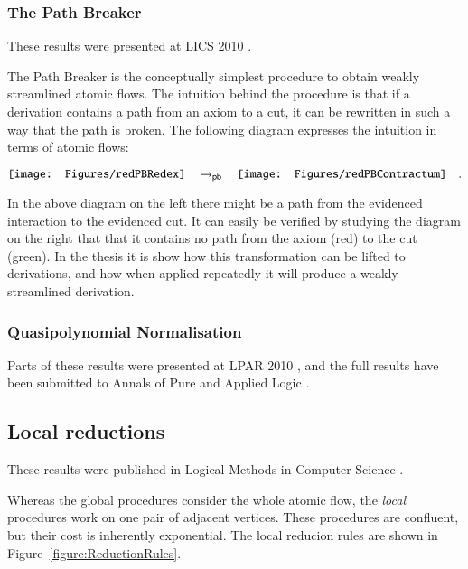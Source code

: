\subsubsection{The Path Breaker}

These results were presented at LICS 2010 \cite{GuglGundStra::Breaking:uq}.

The Path Breaker is the conceptually simplest procedure to obtain weakly streamlined atomic flows. The intuition behind the procedure is that if a derivation contains a path from an axiom to a cut, it can be rewritten in such a way that the path is broken. The following diagram expresses the intuition in terms of atomic flows:

\newcommand{\frpb}{{\mathsf{pb}}}
\[
\vcenter{\hbox{\texttt{[image: Figures/redPBRedex]}}}
\quad\to_\frpb\quad
\vcenter{\hbox{\texttt{[image: Figures/redPBContractum]}}}
\quad.
\]

In the above diagram on the left there might be a path from the evidenced interaction to the evidenced cut. It can easily be verified by studying the diagram on the right that that it contains no path from the axiom (red) to the cut (green). In the thesis it is show how this transformation can be lifted to derivations, and how when applied repeatedly it will produce a weakly streamlined derivation.

\subsubsection{Quasipolynomial Normalisation}

Parts of these results were presented at LPAR 2010 \cite{BrusGuglGundPari:09:A-Quasip:fk}, and the full results have been submitted to 
Annals of Pure and Applied Logic \cite{BrusGuglGundPari:11:A-Quasip:uq}.


\subsection{Local reductions}

These results were published in Logical Methods in Computer Science \cite{GuglGund:07:Normalis:lr}.

Whereas the global procedures consider the whole atomic flow, the \emph{local} procedures work on one pair of adjacent vertices. These procedures are confluent, but their cost is inherently exponential. The local reducion rules are shown in Figure~\vref{figure:ReductionRules}.

